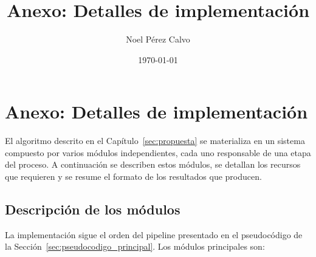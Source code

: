 \documentclass{article} \usepackage[utf8]{inputenc} \usepackage[spanish]{babel} \usepackage{amsmath, amssymb, amsthm} \usepackage{bm} \usepackage{float} \usepackage{longtable} \usepackage[hidelinks]{hyperref}
\title{Anexo: Detalles de implementación} \author{Noel Pérez Calvo} \date{\today}
\begin{document}
\maketitle

\section*{Anexo: Detalles de implementación} \label{sec:anexo_implementacion}

El algoritmo descrito en el Capítulo~\ref{sec:propuesta} se materializa en un sistema compuesto por varios módulos independientes, cada uno responsable de una etapa del proceso. A continuación se describen estos módulos, se detallan los recursos que requieren y se resume el formato de los resultados que producen.

\subsection{Descripción de los módulos} \label{sec:modulos_anexo}

La implementación sigue el orden del pipeline presentado en el pseudocódigo de la Sección~\ref{sec:pseudocodigo_principal}. Los módulos principales son:
\end{document}
